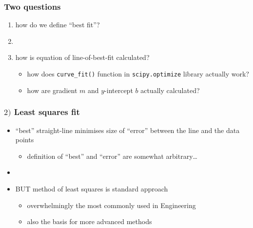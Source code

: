 \documentclass[english,14pt]{beamer}
\newcommand\red[1]{{\color{red} #1}}
\begin{document}

\begin{frame}[fragile]

\frametitle{Two questions}

\begin{enumerate}
	\item how do we define ``best fit''?
	
	\item[]
	
	\item how is equation of line-of-best-fit calculated?
	\begin{itemize}
		\item how does \texttt{curve\_fit()} function in \texttt{scipy.optimize} library actually work?
		\item how are  gradient $m$ and $y$-intercept $b$ actually calculated?
	\end{itemize}

\end{enumerate}

\end{frame}


\begin{frame}[fragile]

\frametitle{$2)$ Least squares fit}

\begin{itemize}
	\item ``best'' straight-line minimises size of ``error'' between the line and the data points
	\begin{itemize}
		\item definition of ``best'' and ``error'' are somewhat arbitrary\ldots
	\end{itemize}
	\item[]
	\item BUT \red{method of least squares} is standard approach
	\begin{itemize}
		\item overwhelmingly the most commonly used in Engineering
		\item also the basis for more advanced methods
	\end{itemize}

\end{itemize}

\end{frame}
\end{document}
